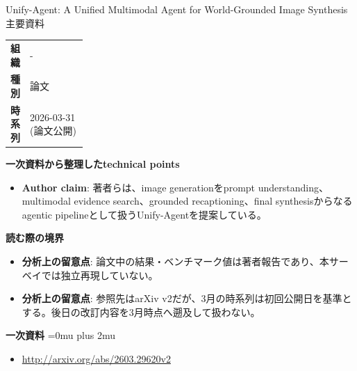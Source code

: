 \begin{technicalnote}{Unify-Agent: A Unified Multimodal Agent for World-Grounded Image Synthesis}{主要資料}
\begingroup
\begin{tabularx}{\linewidth}{@{}>{\bfseries}p{0.22\linewidth}X@{}}
組織 & - \\
種別 & 論文 \\
時系列 & 2026-03-31 (論文公開) \\
\end{tabularx}
\smallskip
{\bfseries 一次資料から整理したtechnical points}
\begin{itemize}[leftmargin=1.5em,itemsep=0.35em]
\item \textbf{Author claim}: 著者らは、image generationをprompt understanding、multimodal evidence search、grounded recaptioning、final synthesisからなるagentic pipelineとして扱うUnify-Agentを提案している。
\end{itemize}
\begin{minipage}{\linewidth}
{\bfseries 読む際の境界}
\begin{itemize}[leftmargin=1.5em,itemsep=0.35em]
\item \textbf{分析上の留意点}: 論文中の結果・ベンチマーク値は著者報告であり、本サーベイでは独立再現していない。
\item \textbf{分析上の留意点}: 参照先はarXiv v2だが、3月の時系列は初回公開日を基準とする。後日の改訂内容を3月時点へ遡及して扱わない。
\end{itemize}
\begin{samepage}
{\bfseries 一次資料}
\begingroup\sloppy
\Urlmuskip=0mu plus 2mu\relax
\begin{itemize}[leftmargin=1.5em,itemsep=0.25em]
\item {\scriptsize\url{http://arxiv.org/abs/2603.29620v2}}
\end{itemize}
\endgroup
\end{samepage}
\end{minipage}
\endgroup
\end{technicalnote}
\medskip

